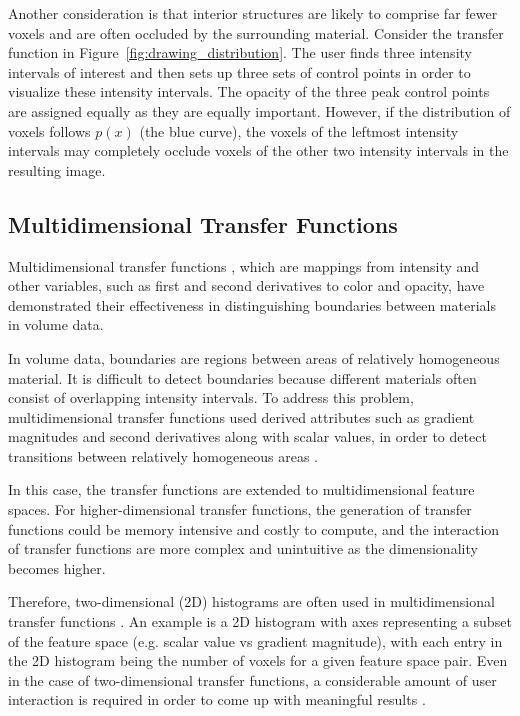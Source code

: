 \documentclass{egpubl}
\begin{document}
Another consideration is that interior structures are likely to comprise far fewer voxels and are often occluded by the surrounding material.
Consider the transfer function in Figure~\ref{fig:drawing_distribution}. The user finds three intensity intervals of interest and then sets up three sets of control points in order to visualize these intensity intervals. The opacity of the three peak control points are assigned equally as they are equally important.
However, if the distribution of voxels follows $ p(x) $ (the blue curve), the voxels of the leftmost intensity intervals may completely occlude voxels of the other two intensity intervals in the resulting image.


\subsection{Multidimensional Transfer Functions}
Multidimensional transfer functions \cite{kniss_interactive_2001}, which are mappings from intensity and other variables, such as first and second derivatives to color and opacity, have demonstrated their effectiveness in distinguishing boundaries between materials in volume data.



In volume data, boundaries are regions between areas of relatively homogeneous material. It is difficult to detect boundaries because different materials often consist of overlapping intensity intervals. To address this problem, multidimensional transfer functions used derived attributes such as gradient magnitudes and second derivatives along with scalar values, in order to detect transitions between relatively homogeneous areas \cite{kindlmann_semi-automatic_1998} \cite{kindlmann_transfer_2002}.


In this case, the transfer functions are extended to multidimensional feature spaces.
For higher-dimensional transfer functions, the generation of transfer functions could be memory intensive and costly to compute, and the interaction of transfer functions are more complex and unintuitive as the dimensionality becomes higher. 

Therefore, two-dimensional (2D) histograms are often used in multidimensional transfer functions \cite{maciejewski_structuring_2009}. An example is a 2D histogram with axes representing a subset of the feature space (e.g. scalar value vs gradient magnitude), with each entry in the 2D histogram being the number of voxels for a given feature space pair.
Even in the case of two-dimensional transfer functions, a considerable amount of user interaction is required in order to come up with meaningful results \cite{arens_survey_2010}.
\end{document}
